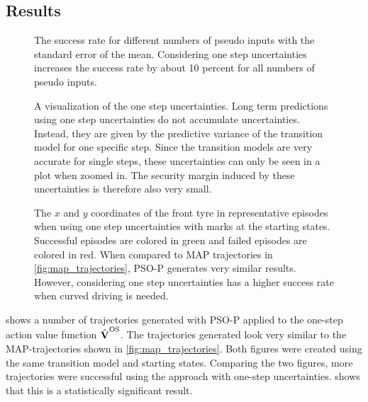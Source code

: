 \subsection{Results}
\begin{figure}[tp]
    \centering
    \caption[Results using one step uncertainties]{
        The success rate for different numbers of pseudo inputs with the standard error of the mean.
        Considering one step uncertainties increases the success rate by about 10 percent for all numbers of pseudo inputs.
    }
    \label{fig:os_results}
\end{figure}
\begin{figure}[tp]
    \centering
    \caption[One step uncertainties]{
        A visualization of the one step uncertainties.
        Long term predictions using one step uncertainties do not accumulate uncertainties.
        Instead, they are given by the predictive variance of the transition model for one specific step.
        Since the transition models are very accurate for single steps, these uncertainties can only be seen in a plot when zoomed in.
        The security margin induced by these uncertainties is therefore also very small.
    }
    \label{fig:os_uncertainties}
\end{figure}
\begin{figure}[p]
    \centering
    \caption[Episodes using one step uncertainties]{
        The $x$ and $y$ coordinates of the front tyre in representative episodes when using one step uncertainties with marks at the starting states.
        Successful episodes are colored in green and failed episodes are colored in red.
        When compared to MAP trajectories in \cref{fig:map_trajectories}, PSO-P generates very similar results.
        However, considering one step uncertainties has a higher success rate when curved driving is needed.
    }
    \label{fig:os_trajectories}
\end{figure}
 shows a number of trajectories generated with PSO-P applied to the one-step action value function $\operatorname{\hat{\operatorname{\mathbf{V}}}}^{\text{OS}}$.
The trajectories generated look very similar to the MAP-trajectories shown in \cref{fig:map_trajectories}.
Both figures were created using the same transition model and starting states.
Comparing the two figures, more trajectories were successful using the approach with one-step uncertainties.
 shows that this is a statistically significant result.

